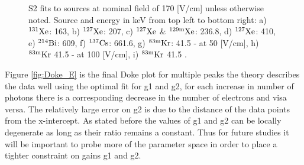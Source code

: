 \begin{figure}[h!]
\bigskip

\hfill
{}
\hfill
{}

\caption{S2 fits to sources at nominal field of 170 [V/cm] unless otherwise noted. Source and energy in keV from top left to bottom right: a) $\rm ^{131}Xe$: 163, b) $\rm ^{127}Xe$:  207, c) $\rm ^{127}Xe$ \&  $\rm ^{129m}Xe$: 236.8, d)  $\rm ^{127}Xe$: 410, e) $\rm ^{214}Bi$: 609, f) $\rm ^{137}Cs$: 661.6, g) $\rm ^{83m}Kr$: 41.5 - at 50 [V/cm], h) $\rm ^{83m}Kr$ 41.5 - at 100 [V/cm], i) $\rm ^{83m}Kr$ 41.5 .}
\label{fig:Doke_Fits_S2}
\end{figure}



Figure \ref{fig:Doke_E} is the final Doke plot for multiple peaks the theory describes the data well using the optimal fit for g1 and g2, for each increase in number of photons there is a corresponding decrease in the number of electrons and visa versa. The relatively large error on g2 is due to the distance of the data points from the x-intercept. As stated before the values of g1 and g2 can be locally degenerate as long as their ratio remains a constant. Thus for future studies it will be important to probe more of the parameter space in order to place a tighter constraint on gains g1 and g2.


